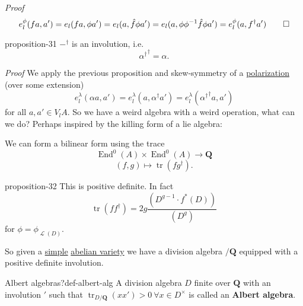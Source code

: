 \documentclass[10pt,]{book}
\makeatletter
\newcommand{\terminology}[1]{\textbf{#1}}
\renewcommand*{\proofname}{Proof}
\renewenvironment{proof}[1][\proofname]{\par
  \pushQED{\qed}%
  \normalfont \topsep6\p@\@plus6\p@\relax
  \trivlist
  \item\relax
    {\itshape
    #1\@addpunct{.}}\hspace\labelsep\ignorespaces
}{%
  \popQED\endtrivlist\@endpefalse
}
\numberwithin{equation}{section}
\newcommand{\sheaf}[1]{\operatorname{\mathcal{#1}}}
\newcommand{\inv}{^{-1}}
\newcommand{\QQ}{\mathbf{Q}}
\DeclareMathOperator{\End}{End}
\DeclareMathOperator{\tr}{tr}
\makeatother
\begin{document}
\begin{proof}\hypertarget{proof-57}{}
\hypertarget{p-337}{}%
%
\begin{equation*}
e_l^\phi(f a ,a')  = e_l(fa, \phi a')= e_l(a, \hat f \phi a') = e_l(a, \phi\phi\inv \hat f \phi a') =  e_l^\phi(a, f^\dagger a')\qedhere
\end{equation*}
%
\end{proof}
\begin{proposition}{}{}{proposition-31}%
\hypertarget{p-338}{}%
\(-^\dagger\) is an involution, i.e.%
\begin{equation*}
{\alpha^\dagger}^{\dagger} = \alpha\text{.}
\end{equation*}
%
\end{proposition}
\begin{proof}\hypertarget{proof-58}{}
\hypertarget{p-339}{}%
We apply the previous proposition and skew-symmetry of a \hyperref[def-polarization]{polarization} (over some extension)%
\begin{equation*}
e_l^\lambda(\alpha a,a') = e_l^\lambda(a, \alpha^\dagger a') = e_l^\lambda({\alpha^\dagger}^{\dagger} a, a')
\end{equation*}
for all \(a,a'\in V_l A\).%
\end{proof}
\hypertarget{p-340}{}%
So we have a weird algebra with a weird operation, what can we do? Perhaps inspired by the killing form of a lie algebra:%
\par
\hypertarget{p-341}{}%
We can form a bilinear form using the trace%
\begin{equation*}
\End^0(A) \times \End^0(A) \to \QQ
\end{equation*}
%
\begin{equation*}
(f,g) \mapsto \tr(fg^\dagger)\text{.}
\end{equation*}
%
\begin{proposition}{}{}{proposition-32}%
\hypertarget{p-342}{}%
This is positive definite. In fact%
\begin{equation*}
\tr(ff^\dagger) = 2g\frac{(D^{g-1}\cdot f^*(D))}{(D^g)}
\end{equation*}
for \(\phi = \phi_{\sheaf L(D)}\).%
\end{proposition}
\hypertarget{p-343}{}%
So given a \hyperref[def-simple-av]{simple} \hyperref[def-buntes-abvar]{abelian variety} we have a division algebra  \(/ \QQ\) equipped with  a positive definite involution.%
\begin{definition}{Albert algebras?}{def-albert-alg}%
\hypertarget{p-344}{}%
A division algebra \(D\) finite over \(\QQ\) with an involution \('\) such that \(\tr_{D/\QQ}(xx') > 0\ \forall x\in D^\times\) is called an \terminology{Albert algebra}.%
\end{definition}
\end{document}
